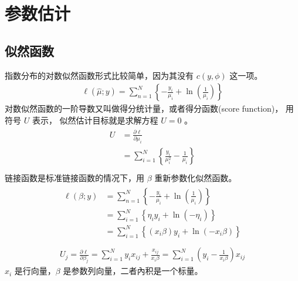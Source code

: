 \documentclass[letterpaper,10pt,english]{sphinxmanual}
\begin{document}
\section{参数估计}
\label{\detokenize{_u6307_u6570_u6a21_u578b/content:id7}}

\subsection{似然函数}
\label{\detokenize{_u6307_u6570_u6a21_u578b/content:id8}}
指数分布的对数似然函数形式比较简单，因为其没有 \(c(y,\phi)\) 这一项。
\begin{equation}\label{equation:指数模型/content:eq_exponential_ell}
\begin{split}\ell(\hat{\mu};y) = \sum_{n=1}^{N} \left \{
- \frac{y_i}{\mu_i} + \ln \left ( \frac{1}{\mu_i} \right )
\right \}\end{split}
\end{equation}
对数似然函数的一阶导数又叫做得分统计量，或者得分函数(score function)，
用符号 \(U\) 表示，
似然估计目标就是求解方程 \(U=0\)
。
\begin{align}\label{equation:指数模型/content:指数模型/content:13}\!\begin{aligned}
U &= \frac{\partial \ell}{\partial \mu_i}\\
&=\sum_{i=1}^{N} \left \{
    \frac{y_i}{\mu_i^2} - \frac{1}{\mu_i}
\right \}\\
\end{aligned}\end{align}
链接函数是标准链接函数的情况下，用 \(\beta\) 重新参数化似然函数。
\begin{align}\label{equation:指数模型/content:指数模型/content:14}\!\begin{aligned}
\ell(\beta;y) &= \sum_{n=1}^{N} \left \{
- \frac{y_i}{\mu_i} + \ln \left ( \frac{1}{\mu_i} \right )
\right \}\\
&= \sum_{i=1}^{N} \left \{
\eta_i y_i + \ln \left ( -\eta_i \right ) \right \}\\
&= \sum_{i=1}^{N} \left \{
( x_i\beta) y_i + \ln \left ( - x_i\beta \right ) \right \}\\
\end{aligned}\end{align}\begin{equation}\label{equation:指数模型/content:指数模型/content:15}
\begin{split}U_j = \frac{\partial \ell}{\partial \beta_j} =
\sum_{i=1}^{N} y_i x_{ij} + \frac{x_{ij}}{ x_i\beta}
= \sum_{i=1}^{N} \left ( y_i - \frac{1}{ x_i\beta} \right ) x_{ij}\end{split}
\end{equation}
\(x_i\) 是行向量，\(\beta\) 是参数列向量，二者內积是一个标量。
\end{document}
